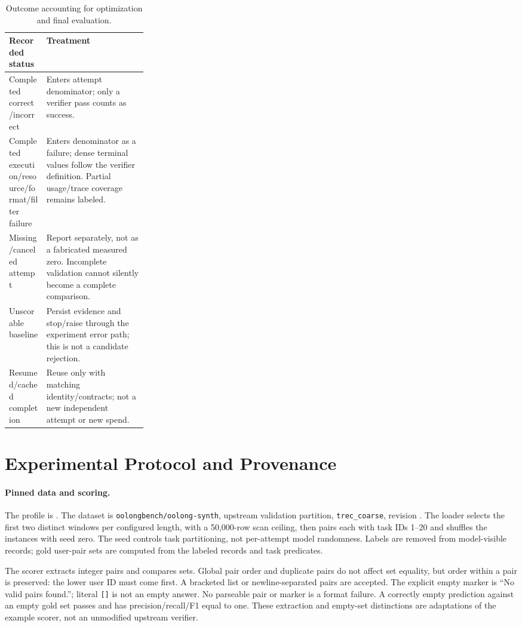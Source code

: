\begin{table}[htbp]
\centering\small
\begin{tabularx}{\linewidth}{@{}p{0.27\linewidth}X@{}}
\toprule
Recorded status & Treatment \\
\midrule
Completed correct/incorrect & Enters attempt denominator; only a verifier pass counts as success. \\
Completed execution/resource/format/filter failure & Enters denominator as a failure; dense terminal values follow the verifier definition. Partial usage/trace coverage remains labeled. \\
Missing/canceled attempt & Report separately, not as a fabricated measured zero. Incomplete validation cannot silently become a complete comparison. \\
Unscorable baseline & Persist evidence and stop/raise through the experiment error path; this is not a candidate rejection. \\
Resumed/cached completion & Reuse only with matching identity/contracts; not a new independent attempt or new spend. \\
\bottomrule
\end{tabularx}
\caption{Outcome accounting for optimization and final evaluation.}
\end{table}

\section{Experimental Protocol and Provenance}
\label{app:protocol}

\paragraph{Pinned data and scoring.}
The profile is .
The dataset is \texttt{oolongbench/oolong-synth}, upstream validation partition,
\texttt{trec\_coarse}, revision
. The loader selects the first
two distinct windows per configured length, with a 50,000-row scan ceiling,
then pairs each with task IDs 1--20 and shuffles the instances with seed zero.
The seed controls task partitioning, not per-attempt model randomness. Labels
are removed from model-visible records; gold user-pair sets are computed from
the labeled records and task predicates.

The scorer extracts integer pairs and compares sets. Global pair order and
duplicate pairs do not affect set equality, but order within a pair is preserved:
the lower user ID must come first. A bracketed list or newline-separated pairs
are accepted. The explicit empty marker is ``No valid pairs found.''; literal
\texttt{[]} is not an empty answer. No parseable pair or marker is a format
failure. A correctly empty prediction against an empty gold set passes and has
precision/recall/F1 equal to one. These extraction and empty-set distinctions
are adaptations of the example scorer, not an unmodified upstream verifier.

